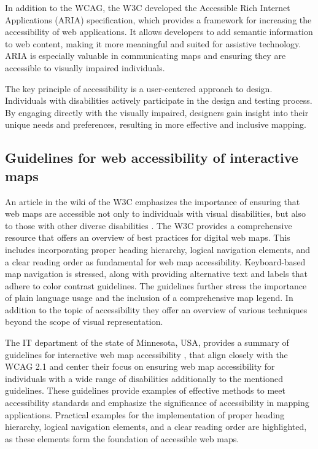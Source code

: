 \documentclass[agile, final]{copernicus-agile}
\begin{document}
In addition to the WCAG, the W3C developed the Accessible Rich Internet Applications (ARIA) specification, which provides a framework for increasing the accessibility of web applications. It allows developers to add semantic information to web content, making it more meaningful and suited for assistive technology. ARIA is especially valuable in communicating maps and ensuring they are accessible to visually impaired individuals.

The key principle of accessibility is a user-centered approach to design. Individuals with disabilities actively participate in the design and testing process. By engaging directly with the visually impaired, designers gain insight into their unique needs and preferences, resulting in more effective and inclusive mapping.

\subsection{Guidelines for web accessibility of interactive maps}

An article in the wiki of the W3C emphasizes the importance of ensuring that web maps are accessible not only to individuals with visual disabilities, but also to those with other diverse disabilities \citep{W3C2012}. The W3C provides a comprehensive resource that offers an overview of best practices for digital web maps. This includes incorporating proper heading hierarchy, logical navigation elements, and a clear reading order as fundamental for web map accessibility. Keyboard-based map navigation is stressed, along with providing alternative text and labels that adhere to color contrast guidelines. The guidelines further stress the importance of plain language usage and the inclusion of a comprehensive map legend. In addition to the topic of accessibility they offer an overview of various techniques  beyond the scope of visual representation.

The IT department of the state of Minnesota, USA, provides a summary of guidelines for interactive web map accessibility \citep{MinnesotaIT2023}, that align closely with the WCAG 2.1 and center their focus on ensuring web map accessibility for individuals with a wide range of disabilities additionally to the mentioned guidelines. These guidelines provide examples of effective methods to meet accessibility standards and emphasize the significance of accessibility in mapping applications. Practical examples for the implementation of proper heading hierarchy, logical navigation elements, and a clear reading order are highlighted, as these elements form the foundation of accessible web maps.
\end{document}
